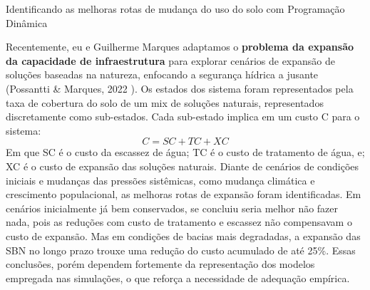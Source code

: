 \documentclass[./main.tex]{subfiles}
\begin{document}
\begin{simplebox}[
    float=ht!,
    label={destaque_programacao_dinamica},
    nameref={Programação Dinâmica}
    ]{Identificando as melhoras rotas de mudança do uso do solo com Programação Dinâmica}
    \begin{minipage}[t]{\linewidth}
    
    \par Recentemente, eu e Guilherme Marques adaptamos o \textbf{problema da expansão da capacidade de infraestrutura} para explorar cenários de expansão de soluções baseadas na natureza, enfocando a segurança hídrica a jusante (Possantti \& Marques, 2022 \cite{Possantti2022a}). Os estados dos sistema foram representados pela taxa de cobertura do solo de um mix de soluções naturais, representados discretamente como sub-estados. Cada sub-estado implica em um custo C para o sistema:
    \begin{equation}
        \label{eq:dpcost}
        C = SC + TC + XC
    \end{equation}
    Em que SC é o custo da escassez de água; TC é o custo de tratamento de água, e; XC é o custo de expansão das soluções naturais. Diante de cenários de condições iniciais e mudanças das pressões sistêmicas, como mudança climática e crescimento populacional, as melhoras rotas de expansão foram identificadas. Em cenários inicialmente já bem conservados, se concluiu seria melhor não fazer nada, pois as reduções com custo de tratamento e escassez não compensavam o custo de expansão. Mas em condições de bacias mais degradadas, a expansão das SBN no longo prazo trouxe uma redução do custo acumulado de até 25\%. Essas conclusões, porém dependem fortemente da representação dos modelos empregada nas simulações, o que reforça a necessidade de adequação empírica.
    
    \end{minipage}
\label{box:dp}
\normalsize
\end{simplebox}
\end{document}
